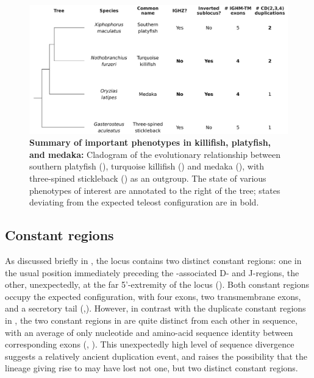 \begin{figure}
\centering
\includegraphics[width=\textwidth]{_Figures/png/species-tree-small}
\caption[Summary of important \igh{} phenotypes in killifish, platyfish, and medaka]{\textbf{Summary of important \igh{} phenotypes in killifish, platyfish, and medaka:} Cladogram of the evolutionary relationship between southern platyfish (\xma), turquoise killifish (\nfu) and medaka (), with three-spined stickleback () as an outgroup. The state of various \igh{} phenotypes of interest are annotated to the right of the tree; states deviating from the expected teleost configuration are in bold.}
\label{fig:species-tree-small}
\end{figure}
	
\subsection{Constant regions}
\label{sec:xma-locus-constant}
	
As discussed briefly in , the \Xma \igh{} locus contains two distinct  constant regions: one in the usual position immediately preceding the -associated D- and J-regions, the other, unexpectedly, at the far 5'-extremity of the locus (). Both  constant regions occupy the expected configuration, with four \cz{} exons, two transmembrane exons, and a secretory tail (,). However, in contrast with the duplicate constant regions in \Nfu, the two  constant regions in \Xma are quite distinct from each other in sequence, with an average of only  nucleotide and  amino-acid sequence identity between corresponding \cz{} exons (, ). This unexpectedly high level of sequence divergence suggests a relatively ancient duplication event, and raises the possibility that the lineage giving rise to \Nfu may have lost not one, but two distinct  constant regions.
	
